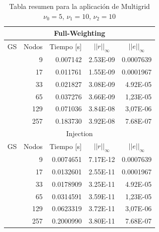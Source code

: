 \documentclass[letter,10pt]{article}
\begin{document}
\begin{table}[H]
\centering
\caption{Tabla resumen para la aplicación de Multigrid $\nu_0=5$, $\nu_1=10$, $\nu_2=10$}
\begin{tabular}[t]{|l|r|r|r|r|}
\hline
\multicolumn{5}{|c|}{Full-Weighting}\\ \hline
\multicolumn{ 1}{|c|}{GS} & \multicolumn{1}{l|}{Nodos} & \multicolumn{1}{l|}{Tiempo [s]} & \multicolumn{1}{c|}{$||r||_{\infty}$} & \multicolumn{1}{c|}{$||e||_{\infty}$} \\ \cline{ 2- 5}
\multicolumn{ 1}{|l|}{} &9 & 0.007142 & 2.53E-09 & 0.0007639 \\ \cline{ 2- 5}
\multicolumn{ 1}{|l|}{} & 17 & 0.011761 & 1.55E-09 & 0.0001967 \\ \cline{ 2- 5}
\multicolumn{ 1}{|l|}{} & 33 & 0.021827 & 3.08E-09 & 4.92E-05 \\ \cline{ 2- 5}
\multicolumn{ 1}{|l|}{} & 65 & 0.037276 & 3.66E-09 & 1,23E-05 \\ \cline{ 2- 5}
\multicolumn{ 1}{|l|}{} & 129 & 0.071036 & 3.84E-08 & 3,07E-06 \\ \cline{ 2- 5}
\multicolumn{ 1}{|l|}{} & 257 & 0.183730 & 3.92E-08 & 7.68E-07 \\ \hline
\multicolumn{5}{|c|}{Injection}\\ \hline
\multicolumn{ 1}{|c|}{GS} & \multicolumn{1}{l|}{Nodos} &\multicolumn{1}{l|}{Tiempo [s]}&  \multicolumn{1}{c|}{$||r||_{\infty}$} & \multicolumn{1}{c|}{$||e||_{\infty}$} \\ \cline{ 2- 5}
\multicolumn{1}{|l|}{} &9 & 0.0074651 & 7.17E-12 & 0.0007639 \\ \cline{ 2- 5}
\multicolumn{1}{|l|}{} & 17 & 0.0132601 & 2.55E-11 & 0.0001967 \\ \cline{ 2- 5}
\multicolumn{1}{|l|}{} & 33 & 0.0178909 & 3.25E-11 & 4.92E-05 \\ \cline{ 2- 5}
\multicolumn{ 1}{|l|}{} & 65 & 0.0314591 & 3.59E-11 & 1,23E-05 \\ \cline{ 2- 5}
\multicolumn{1}{|l|}{} & 129 & 0.0623319 & 3.72E-11 & 3,07E-06 \\ \cline{ 2- 5}
\multicolumn{1}{|l|}{} & 257 & 0.2000990 & 3.80E-11 & 7.68E-07 \\ \hline
\end{tabular}
\label{resumenmg10105}
\end{table}
\end{document}
